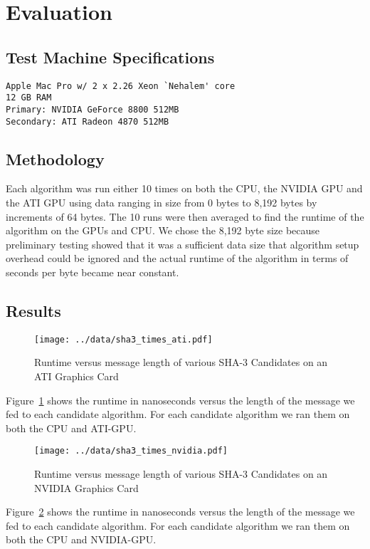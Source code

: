 \section*{Evaluation}

\subsection*{Test Machine Specifications}
\begin{verbatim}
Apple Mac Pro w/ 2 x 2.26 Xeon `Nehalem' core
12 GB RAM
Primary: NVIDIA GeForce 8800 512MB
Secondary: ATI Radeon 4870 512MB
\end{verbatim}

\subsection*{Methodology}
Each algorithm was run either 10 times on both the CPU, the NVIDIA GPU and the ATI GPU using data ranging in size from 0 bytes to 8,192 bytes by increments of 64 bytes.
The 10 runs were then averaged to find the runtime of the algorithm on the GPUs and CPU.
We chose the 8,192 byte size because preliminary testing showed that it was a sufficient data size that algorithm setup overhead could be ignored and the actual runtime of the algorithm in terms of seconds per byte became near constant.

\subsection*{Results}

\begin{figure}[htp]
\texttt{[image: ../data/sha3\_times\_ati.pdf]}
\caption{Runtime versus message length of various SHA-3 Candidates on an ATI Graphics Card}\label{fig:sha3_times_ati}
\end{figure}

Figure~\ref{fig:sha3_times_ati} shows the runtime in nanoseconds versus the length of the message we fed to each candidate algorithm. For each candidate algorithm we ran them on both the CPU and ATI-GPU.

\begin{figure}[htp]
\texttt{[image: ../data/sha3\_times\_nvidia.pdf]}
\caption{Runtime versus message length of various SHA-3 Candidates on an NVIDIA Graphics Card}\label{fig:sha3_times_nvidia}
\end{figure}

Figure~\ref{fig:sha3_times_nvidia} shows the runtime in nanoseconds versus the length of the message we fed to each candidate algorithm. For each candidate algorithm we ran them on both the CPU and NVIDIA-GPU.

